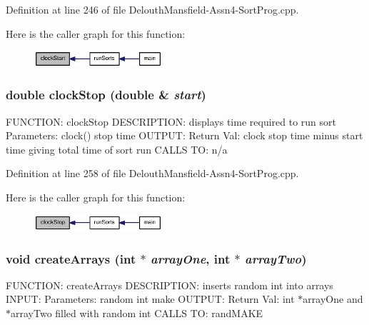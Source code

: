 Definition at line 246 of file DelouthMansfield-\/Assn4-\/SortProg.cpp.



Here is the caller graph for this function:\nopagebreak
\begin{figure}[H]
\begin{center}
\leavevmode
\includegraphics[width=134pt]{_delouth_mansfield-_assn4-_sort_prog_8cpp_a97da3b77b5ebacff9297f22e54185c1a_icgraph}
\end{center}
\end{figure}


\hypertarget{_delouth_mansfield-_assn4-_sort_prog_8cpp_aa5a4dbee524f1aa5d109bcdeeda1b9f6}{
\subsubsection[{clockStop}]{\setlength{\rightskip}{0pt plus 5cm}double clockStop (double \& {\em start})}}
\label{_delouth_mansfield-_assn4-_sort_prog_8cpp_aa5a4dbee524f1aa5d109bcdeeda1b9f6}
FUNCTION: clockStop DESCRIPTION: displays time required to run sort Parameters: clock() stop time OUTPUT: Return Val: clock stop time minus start time giving total time of sort run CALLS TO: n/a 

Definition at line 258 of file DelouthMansfield-\/Assn4-\/SortProg.cpp.



Here is the caller graph for this function:\nopagebreak
\begin{figure}[H]
\begin{center}
\leavevmode
\includegraphics[width=134pt]{_delouth_mansfield-_assn4-_sort_prog_8cpp_aa5a4dbee524f1aa5d109bcdeeda1b9f6_icgraph}
\end{center}
\end{figure}


\hypertarget{_delouth_mansfield-_assn4-_sort_prog_8cpp_af209aad9d447548ca062515ab1acbe3c}{
\subsubsection[{createArrays}]{\setlength{\rightskip}{0pt plus 5cm}void createArrays (int $\ast$ {\em arrayOne}, \/  int $\ast$ {\em arrayTwo})}}
\label{_delouth_mansfield-_assn4-_sort_prog_8cpp_af209aad9d447548ca062515ab1acbe3c}
FUNCTION: createArrays DESCRIPTION: inserts random int into arrays INPUT: Parameters: random int make OUTPUT: Return Val: int $\ast$arrayOne and $\ast$arrayTwo filled with random int CALLS TO: randMAKE 

